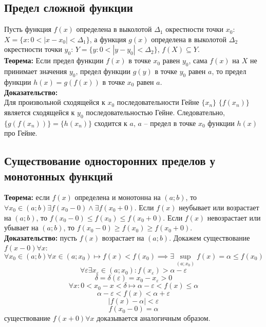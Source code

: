 \documentclass{article}
\begin{document}
    \subsection*{Предел сложной функции}
        Пусть функция $f(x)$ определена в выколотой $\Delta_1$ окрестности точки $x_0$: $X = \{x: 0 < |x - x_0| < \Delta_1\}$,
        а функция $g(x)$ определена в выколотой $\Delta_2$ окрестности точки $y_0$: $Y = \{y: 0 < |y - y_0| < \Delta_2\}$,
        $f(X) \subseteq Y$.
        \\
        \textbf{Теорема:} Если предел функции $f(x)$ в точке $x_0$ равен $y_0$, сама $f(x)$ на $X$ не принимает значения $y_0$, предел функции $g(y)$ в точке $y_0$ равен $a$,
        то предел функции $h(x) = g(f(x))$ в точке $x_0$ равен $a$.
        \\
        \textbf{Доказательство:}
        \\
        Для произвольной сходящейся к $x_0$ последовательности Гейне $\{x_n\}$ $\{f(x_n)\}$ является сходящейся к $y_0$ последовательностью Гейне.
        Следовательно, $\{g(f(x_n))\} = \{h(x_n)\}$ сходится к $a$, $a$ -- предел в точке $x_0$ функции $h(x)$ про Гейне.
    
    
    \subsection*{Существование односторонних пределов у монотонных функций}
        \textbf{Теорема:} если $f(x)$ определена и монотонна на $(a;b)$, то $ \forall x_0 \in (a;b) \exists f(x_0 - 0) \wedge \exists f(x_0 + 0)$.
        Если $f(x)$ неубывает или возрастает на $(a;b)$, то $f(x_0 - 0) \le f(x_0) \le f(x_0 + 0)$.
        Если $f(x)$ невозрастает или убывает на $(a;b)$, то $f(x_0 - 0) \ge f(x_0) \ge f(x_0 + 0)$.
        \\
        \textbf{Доказательство:} пусть $f(x)$ возрастает на $(a;b)$.
        Докажем существование $f(x - 0) \forall x$:
        \[ \forall x_0 \in (a;b) \forall x \in (a;x_0) \longmapsto f(x) < f(x_0) \implies \exists \sup_{(a;x_0)} f(x) = \alpha \le f(x_0)\]
        \[ \forall \varepsilon \exists x_\varepsilon \in (a;x_0): f(x_\varepsilon) > \alpha - \varepsilon \]
        \[ \delta = \delta(\varepsilon) = x_0 - x_\varepsilon > 0 \]
        \[ \forall x: 0 < x_0 - x < \delta \longmapsto \alpha - \varepsilon < f(x) \le \alpha\]
        \[ \alpha - \varepsilon < f(x) < \alpha + \varepsilon \]
        \[ |f(x) - \alpha| < \varepsilon \]
        \[ f(x_0 - 0) = \alpha \]
        существование $f(x + 0) \forall x$ доказывается аналогичным образом.
\end{document}
